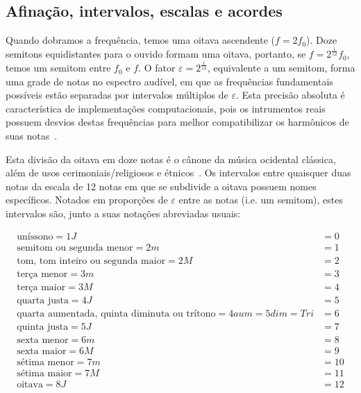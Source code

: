 \subsection{Afinação, intervalos, escalas e acordes}
Quando dobramos a frequência, temos uma oitava ascendente ($f=2f_0$).
Doze semitons equidistantes para o ouvido formam uma oitava,
portanto, se $f=2^{\frac{1}{12}}f_0$, temos um semitom entre $f_0$
e $f$.
O fator $\varepsilon=2^{\frac{1}{12}}$, equivalente a um semitom, forma uma grade de notas
no espectro audível, em que as frequências fundamentais possíveis
estão separadas por intervalos múltiplos de $\varepsilon$.
Esta precisão absoluta é característica de implementações
computacionais, pois os intrumentos reais possuem desvios destas frequências para melhor compatibilizar os harmônicos
de suas notas~\cite{Roederer}.

Esta divisão da oitava em doze notas é o cânone da música ocidental clássica,
além de usos cerimoniais/religiosos e étnicos~\cite{Wisnick}. Os intervalos entre quaisquer duas notas da escala de 12 notas em que se subdivide a oitava possuem nomes específicos. Notados em proporções de $\varepsilon$ entre as notas (i.e. um semitom), estes intervalos são, junto a suas notações abreviadas usuais:

\begin{equation}
\begin{split}
\text{uníssono} = 1J & = 0 \\
\text{semitom ou segunda menor} =2m & = 1 \\
\text{tom, tom inteiro ou segunda maior} =2M & = 2 \\
\text{terça menor} = 3m & = 3 \\
\text{terça maior} = 3M & = 4 \\
\text{quarta justa} = 4J & = 5 \\
\text{quarta aumentada, quinta diminuta ou trítono} = 4aum = 5dim = Tri & = 6 \\
\text{quinta justa} = 5J & = 7 \\
\text{sexta menor} = 6m & = 8 \\
\text{sexta maior} = 6M & = 9 \\
\text{sétima menor} = 7m & = 10 \\
\text{sétima maior} = 7M & = 11 \\
\text{oitava} = 8J & = 12
\end{split}
\end{equation}

